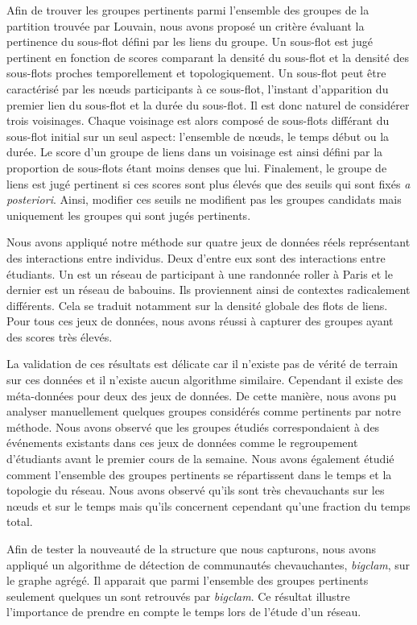Afin de trouver les groupes pertinents parmi l'ensemble des groupes de la partition trouvée par Louvain, nous avons proposé un critère évaluant la pertinence du sous-flot défini par les liens du groupe.
Un sous-flot est jugé pertinent en fonction de scores comparant la densité du sous-flot et la densité des sous-flots proches temporellement et topologiquement.
Un sous-flot peut être caractérisé par les n\oe uds participants à ce sous-flot, l'instant d'apparition du premier lien du sous-flot et la durée du sous-flot.
Il est donc naturel de considérer trois voisinages.
Chaque voisinage est alors composé de sous-flots différant du sous-flot initial sur un seul aspect: l'ensemble de n\oe uds, le temps début ou la durée.
Le score d'un groupe de liens dans un voisinage est ainsi défini par la proportion de sous-flots étant moins denses que lui.
Finalement, le groupe de liens est jugé pertinent si ces scores sont plus élevés que des seuils qui sont fixés \emph{a posteriori}.
Ainsi, modifier ces seuils ne modifient pas les groupes candidats mais uniquement les groupes qui sont jugés pertinents.


Nous avons appliqué notre méthode sur quatre jeux de données réels représentant des interactions entre individus.
Deux d'entre eux sont des interactions entre étudiants.
Un est un réseau de participant à une randonnée roller à Paris et le dernier est un réseau de babouins.
Ils proviennent ainsi de contextes radicalement différents.
Cela se traduit notamment sur la densité  globale des flots de liens.
Pour tous ces jeux de données, nous avons réussi à capturer des groupes ayant des scores très élevés.

La validation de ces résultats est délicate car il n'existe pas de vérité de terrain sur ces données et il n'existe aucun algorithme similaire.
Cependant il existe des méta-données pour deux des jeux de données.
De cette manière, nous avons pu analyser manuellement quelques groupes considérés comme pertinents par notre méthode.
Nous avons observé que les groupes étudiés correspondaient à des événements existants dans ces jeux de données comme le regroupement d'étudiants avant le premier cours de la semaine.
Nous avons également étudié comment l'ensemble des groupes pertinents se répartissent dans le temps et la topologie du réseau.
Nous avons observé qu'ils sont très chevauchants sur les n\oe uds et sur le temps mais qu'ils concernent cependant qu'une fraction du temps total.


Afin de tester la nouveauté de la structure que nous capturons, nous avons appliqué un algorithme de détection de communautés chevauchantes, \emph{bigclam}, sur le graphe agrégé.
Il apparait que parmi l'ensemble des groupes pertinents seulement quelques un sont retrouvés par \emph{bigclam}.
Ce résultat illustre l'importance de prendre en compte le temps lors de l'étude d'un réseau.



